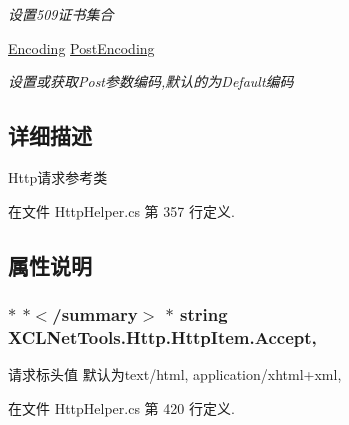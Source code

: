 \begin{DoxyCompactItemize}
\begin{DoxyCompactList}\small\item\em 设置509证书集合 \end{DoxyCompactList}\item 
\hyperlink{class_x_c_l_net_tools_1_1_http_1_1_http_item_aa3c95b011d9366a1de9f897603b71b93}{Encoding} \hyperlink{class_x_c_l_net_tools_1_1_http_1_1_http_item_a75c55be0dc77b94b342b4360e0e4c6fa}{Post\-Encoding}
\begin{DoxyCompactList}\small\item\em 设置或获取\-Post参数编码,默认的为\-Default编码 \end{DoxyCompactList}\end{DoxyCompactItemize}


\subsection{详细描述}
Http请求参考类 



在文件 Http\-Helper.\-cs 第 357 行定义.



\subsection{属性说明}
\hypertarget{class_x_c_l_net_tools_1_1_http_1_1_http_item_add8bdd43831813b22267a47cf46f7768}{
\subsubsection[{Accept}]{\setlength{\rightskip}{0pt plus 5cm}$\ast$ $\ast$$<$/summary$>$ $\ast$ string X\-C\-L\-Net\-Tools.\-Http.\-Http\-Item.\-Accept\hspace{0.3cm}{\ttfamily [get]}, {\ttfamily [set]}}}\label{class_x_c_l_net_tools_1_1_http_1_1_http_item_add8bdd43831813b22267a47cf46f7768}


请求标头值 默认为text/html, application/xhtml+xml, 



在文件 Http\-Helper.\-cs 第 420 行定义.

